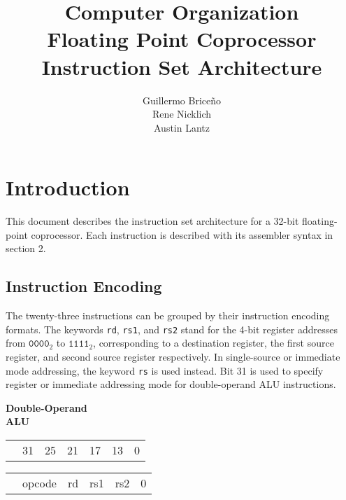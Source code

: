 \documentclass{article}
\title{
	\vspace{2in}
	\textmd{Computer Organization \\ Floating Point Coprocessor}\\
	\vspace{1cm}
	\textmd{\textbf{Instruction Set Architecture}}
	\vspace{5cm}
}
\author{Guillermo Brice\~{n}o \\ Rene Nicklich \\ Austin Lantz}
\begin{document}
\maketitle

\pagebreak

\section{Introduction}
This document describes the instruction set architecture for a 32-bit floating-point coprocessor. Each instruction is described with its assembler syntax in section 2.\\

\subsection{Instruction Encoding}
The twenty-three instructions can be grouped by their instruction encoding formats. The keywords \texttt{rd}, \texttt{rs1}, and \texttt{rs2} stand for the 4-bit register addresses from $\texttt{0000}_2$ to $\texttt{1111}_2$, corresponding to a destination register, the first source register, and second source register respectively. In single-source or immediate mode addressing, the keyword \texttt{rs} is used instead. Bit 31 is used to specify register or immediate addressing mode for double-operand ALU instructions.

\normalsize
\bigskip

\begin{minipage}[t]{0.3\textwidth}
	\begin{center}
		\medskip
		\textbf{Double-Operand\\ ALU}
	\end{center}
\end{minipage}
\begin{minipage}[t]{110mm}
	\begin{tabular}{p{12mm}p{14.5mm}p{10mm}p{10mm}p{10mm}p{22.5mm}R{22.5mm}}
		& \footnotesize{31} & \footnotesize{25} & \footnotesize{21} & \footnotesize{17} & \footnotesize{13} & \footnotesize{0} \\ 
	\end{tabular} 

	\begin{tabular}{p{12mm}|C{15mm}|C{10mm}|C{10mm}|C{10mm}|C{45mm}|}
		& opcode & rd & rs1 & rs2 & 0\\ 
	\end{tabular} 
\end{minipage}
\end{document}
